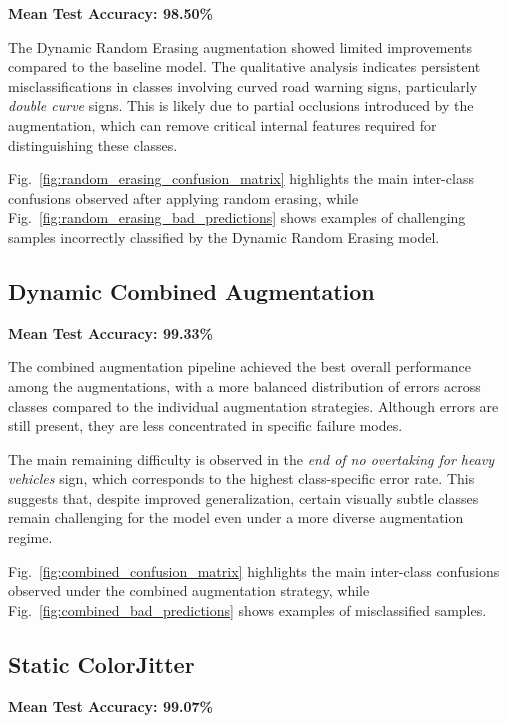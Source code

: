 \documentclass[conference]{IEEEtran}
\begin{document}
\textbf{Mean Test Accuracy: 98.50\%}

The Dynamic Random Erasing augmentation showed limited improvements compared to the baseline model. The qualitative analysis indicates persistent misclassifications in classes involving curved road warning signs, particularly \textit{double curve} signs. This is likely due to partial occlusions introduced by the augmentation, which can remove critical internal features required for distinguishing these classes.

Fig.~\ref{fig:random_erasing_confusion_matrix} highlights the main inter-class confusions observed after applying random erasing, while Fig.~\ref{fig:random_erasing_bad_predictions} shows examples of challenging samples incorrectly classified by the Dynamic Random Erasing model.






\subsection{Dynamic Combined Augmentation}

\textbf{Mean Test Accuracy: 99.33\%}

The combined augmentation pipeline achieved the best overall performance among the augmentations, with a more balanced distribution of errors across classes compared to the individual augmentation strategies. Although errors are still present, they are less concentrated in specific failure modes.

The main remaining difficulty is observed in the \textit{end of no overtaking for heavy vehicles} sign, which corresponds to the highest class-specific error rate. This suggests that, despite improved generalization, certain visually subtle classes remain challenging for the model even under a more diverse augmentation regime.

Fig.~\ref{fig:combined_confusion_matrix} highlights the main inter-class confusions observed under the combined augmentation strategy, while Fig.~\ref{fig:combined_bad_predictions} shows examples of misclassified samples.







\subsection{Static ColorJitter}

\textbf{Mean Test Accuracy: 99.07\%}
\end{document}
